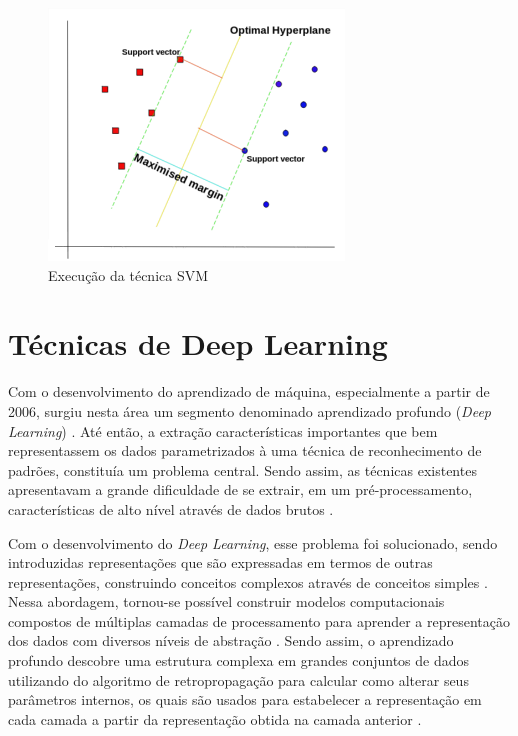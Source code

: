 \begin{figure}[h]
  \centering
  \caption{Execução da técnica SVM}
   \label{fig:execucao_svm}
   \includegraphics[width=0.7\textwidth]{figuras/fig_7.png}
\end{figure}

\section{Técnicas de Deep Learning}

Com o desenvolvimento do aprendizado de máquina, especialmente a partir de 2006, surgiu nesta área um segmento denominado aprendizado profundo (\textit{Deep Learning}) \cite{Deng2014}. Até então, a extração características importantes que bem representassem os dados parametrizados à uma técnica de reconhecimento de padrões, constituía um problema central. Sendo assim, as técnicas existentes apresentavam a grande dificuldade de se extrair, em um pré-processamento, características de alto nível através de dados brutos \cite{Goodfellow2016}. 

Com o desenvolvimento do \textit{Deep Learning}, esse problema foi solucionado, sendo introduzidas representações que são expressadas em termos de outras representações, construindo conceitos complexos através de conceitos simples \cite{Goodfellow2016}. Nessa abordagem, tornou-se possível construir modelos computacionais compostos de múltiplas camadas de processamento para aprender a representação dos dados com diversos níveis de abstração \cite{LeCun2015}. Sendo assim, o aprendizado profundo descobre uma estrutura complexa em grandes conjuntos de dados utilizando do algoritmo de retropropagação para calcular como alterar seus parâmetros internos, os quais são usados para estabelecer a representação em cada camada a partir da representação obtida na camada anterior \cite{LeCun2015}.

